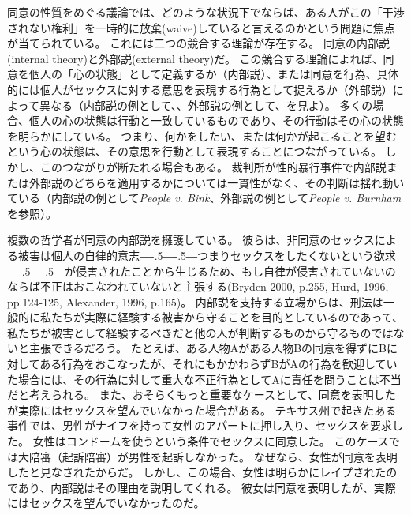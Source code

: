 \documentclass[paper=a4,book,openany]{jlreq}
\def\DDASH{―\kern-.5\zw―\kern-.5\zw―} %
\begin{document}
同意の性質をめぐる議論では、どのような状況下でならば、ある人がこの「干渉されない権利」を一時的に放棄(waive)していると言えるのかという問題に焦点が当てられている。
これには二つの競合する理論が存在する。
同意の内部説(internal theory)と外部説(external theory)だ。
この競合する理論によれば、同意を個人の「心の状態」として定義するか（内部説）、または同意を行為、具体的には個人がセックスに対する意思を表現する行為として捉えるか（外部説）によって異なる（内部説の例として\citet[pp. 124--125]{hurd96:_moral_magic_consen}、\citet[pp.166--167]{alexander96:_moral_magic_consen_ii}、外部説の例として\citet[p.69]{brett98:_sexual_offen_consen}、\citet[p.422]{schulhofer05:_rape_twilig_zone}を見よ）。
多くの場合、個人の心の状態は行動と一致しているものであり、その行動はその心の状態を明らかにしている。
つまり、何かをしたい、または何かが起こることを望むという心の状態は、その意思を行動として表現することにつながっている。
しかし、このつながりが断たれる場合もある。
裁判所が性的暴行事件で内部説または外部説のどちらを適用するかについては一貫性がなく、その判断は揺れ動いている（内部説の例として\emph{People v. Bink}、外部説の例として\emph{People v. Burnham}を参照）。

複数の哲学者が同意の内部説を擁護している。
彼らは、非同意のセックスによる被害は個人の自律的意志{\DDASH}つまりセックスをしたくないという欲求{\DDASH}が侵害されたことから生じるため、もし自律が侵害されていないのならば不正はおこなわれていないと主張する(Bryden 2000, p.255, Hurd, 1996, pp.124-125, Alexander, 1996, p.165)。
\nocite{bryden00:_redef_rape}\nocite{hurd96:_moral_magic_consen}\nocite{alexander96:_moral_magic_consen_ii}
内部説を支持する立場からは、刑法は一般的に私たちが実際に経験する被害から守ることを目的としているのであって、私たちが被害として経験するべきだと他の人が判断するものから守るものではないと主張できるだろう。
たとえば、ある人物Aがある人物Bの同意を得ずにBに対してある行為をおこなったが、それにもかかわらずBがAの行為を歓迎していた場合には、その行為に対して重大な不正行為としてAに責任を問うことは不当だと考えられる。
また、おそらくもっと重要なケースとして、同意を表明したが実際にはセックスを望んでいなかった場合がある。
テキサス州で起きたある事件では、男性がナイフを持って女性のアパートに押し入り、セックスを要求した。
女性はコンドームを使うという条件でセックスに同意した。
このケースでは大陪審（起訴陪審）が男性を起訴しなかった。
なぜなら、女性が同意を表明したと見なされたからだ。
しかし、この場合、女性は明らかにレイプされたのであり、内部説はその理由を説明してくれる。
彼女は同意を表明したが、実際にはセックスを望んでいなかったのだ\citep[cf.][p.137]{hurd96:_moral_magic_consen}。
\end{document}
